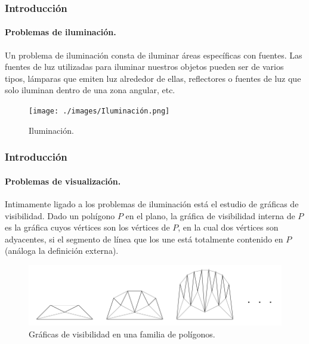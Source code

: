 \begin{frame}
  \frametitle{Introducción}
  \framesubtitle{Problemas de iluminación.} %
  Un problema de iluminación consta de iluminar áreas específicas con fuentes. Las fuentes de luz
  utilizadas para iluminar nuestros objetos pueden ser de varios tipos, lámparas que emiten luz
  alrededor de ellas, reflectores o fuentes de luz que solo iluminan dentro de una zona angular, etc.

  \begin{figure}
    \centering
    \texttt{[image: ./images/Iluminación.png]}
    \caption*{Iluminación.}
  \end{figure}
  
\end{frame}

\begin{frame}
  \frametitle{Introducción}
  \framesubtitle{Problemas de visualización.} %
  Intimamente ligado a los problemas de iluminación está el estudio de gráficas
  de visibilidad. Dado un polıígono $P$ en el plano, la gráfica de visibilidad
  interna de $P$ es la gráfica cuyos vértices son los vértices de $P$, en la cual dos
  vértices son adyacentes, si el segmento de línea que los une está totalmente
  contenido en $P$ (análoga la definición externa).

  \begin{figure}
    \centering
    \includegraphics[width=0.55 \paperwidth]{./images/GraphVisibility.png}
    \caption*{Gráficas de visibilidad en una familia de polígonos.}
  \end{figure}
  
\end{frame}
